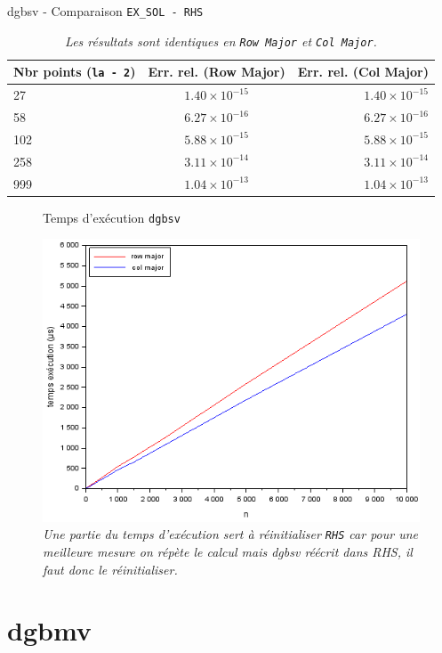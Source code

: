 \documentclass{article}
\begin{document}
\begin{table}[H]
\caption{dgbsv - Comparaison \texttt{EX\_SOL - RHS}}
\centering
\renewcommand*\arraystretch{1.1}
\begin{tabular}{|l|c|r|}
  \hline
  Nbr points (\texttt{la - 2}) & Err. rel. (Row Major) & Err. rel. (Col Major) \\
  \hline
	27	&	\(1.40 \times 10^{-15}\)	&	\(1.40 \times 10^{-15}\)	\\
	58	&	\(6.27 \times 10^{-16}\)	&	\(6.27 \times 10^{-16}\)	\\
	102	&	\(5.88 \times 10^{-15}\)	&	\(5.88 \times 10^{-15}\)	\\
	258	&	\(3.11 \times 10^{-14}\)	&	\(3.11 \times 10^{-14}\)	\\
	999	&	\(1.04 \times 10^{-13}\)	&	\(1.04 \times 10^{-13}\)	\\
  \hline
\end{tabular}
\caption*{\textit{Les résultats sont identiques en \texttt{Row Major} et \texttt{Col Major}.}}
\end{table}
\begin{figure}[H]
\caption{Temps d'exécution \texttt{dgbsv}}
\centering
\includegraphics[scale=0.70]{time_dgbsv}
\caption*{\textit{Une partie du temps d'exécution sert à réinitialiser \texttt{RHS} car pour une meilleure mesure on répète le calcul mais dgbsv réécrit dans RHS, il faut donc le réinitialiser.}}
\end{figure}

\section{dgbmv}
\end{document}
